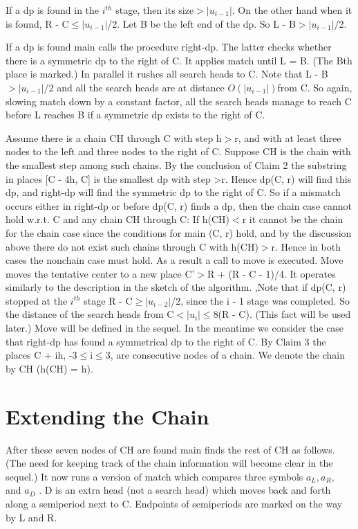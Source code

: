 \documentclass[11pt,a4paper]{report}
\begin{document}
If a dp is found in the $i^{th}$ stage, then its size$>|u_{i-1} |$. On the other hand when it is
found, R - C$\leq |u_{i-1} |$/2. Let B be the left end of the dp. So L - B$>| u_{i-1} |$/2.

If a dp is found main calls the procedure right-dp. The latter checks whether there is a
symmetric dp to the right of C. It applies match until L = B. (The Bth place is marked.)
In parallel it rushes all search heads to C. Note that L - B$>| u_{i-1} |$/2 and all the search
heads are at distance $O(|u_{i-1} |) $from C. So again, slowing match down by a constant
factor, all the search heads manage to reach C before L reaches B if a symmetric dp
exists to the right of C.

Assume there is a chain CH through C with step h$>$r, and with at least three nodes
to the left and three nodes to the right of C. Suppose CH is the chain with the smallest
step among such chains. By the conclusion of Claim 2 the substring in places [C - 4h, C]
is the smallest dp with step >r. Hence dp(C, r) will find this dp, and right-dp will find
the symmetric dp to the right of C. So if a mismatch occurs either in right-dp or before
dp(C, r) finds a dp, then the chain case cannot hold w.r.t. C and any chain CH through
C: If h(CH)$<$r it cannot be the chain for the chain case since the conditions for main
(C, r) hold, and by the discussion above there do not exist such chains through C with
h(CH)$>$r. Hence in both cases the nonchain case must hold. As a result a call to move
is executed. Move moves the tentative center to a new place C’$>$R + (R - C - 1)/4.
It operates similarly to the description in the sketch of the algorithm. ,Note that if dp(C, r)
stopped at the $i^{th}$ stage R - C$\geq  | u_{i-2}| $/2, since the i - 1 stage was completed. So the
distance of the search heads from C$<| u_i |\leq$8(R - C). (This fact will be used later.)
Move will be defined in the sequel. In the meantime we consider the case that right-dp
has found a symmetrical dp to the right of C. By Claim 3 the places C + ih, -3$\leq$i$\leq$3,
are consecutive nodes of a chain. We denote the chain by CH (h(CH) = h). 




\chapter{Extending the Chain}


After these seven nodes of CH are found main finds the rest of CH as follows. (The
need for keeping track of the chain information will become clear in the sequel.) It now
runs a version of match which compares three symbols $a_L , a_R ,$ and $a_D$ . D is an extra
head (not a search head) which moves back and forth along a semiperiod next to C.
Endpoints of semiperiods are marked on the way by L and R.
\end{document}
